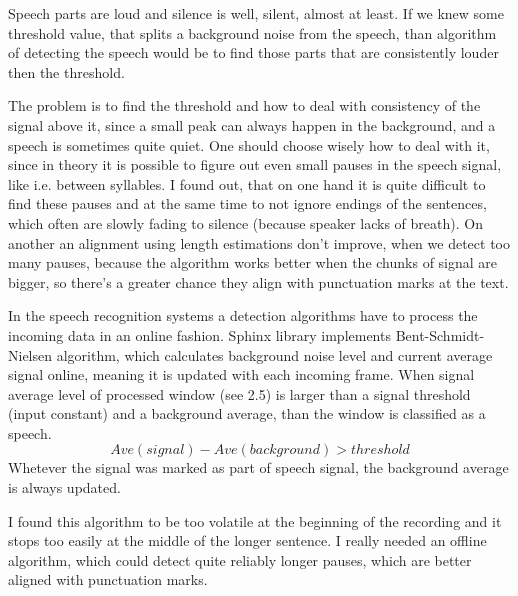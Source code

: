 \documentclass[12pt,a4paper,english]{article}
\begin{document}
\newpage

Speech parts are loud and silence is well, silent, almost at least. If we knew some threshold value, that splits a background noise from the speech, than algorithm of detecting the speech would be to find those parts that are consistently louder then the threshold.  \newline

The problem is to find the threshold and how to deal with consistency of the signal above it, since a small peak can always happen in the background, and a speech is sometimes quite quiet. \newline
One should choose wisely how to deal with it, since in theory it is possible to figure out even small pauses in the speech signal, like i.e. between syllables.
I found out, that on one hand it is quite difficult to find these pauses and at the same time to not ignore endings of the sentences, which often are slowly fading to silence (because speaker lacks of breath). On another an alignment using length estimations don't improve, when we detect too many pauses,
because the algorithm works better when the chunks of signal are bigger, so there's a greater chance they align with punctuation marks at the text. \newline

In the speech recognition systems a detection algorithms have to process the incoming data in an online fashion. Sphinx library implements Bent-Schmidt-Nielsen algorithm, which calculates background noise level and current average signal online, meaning it is updated with each incoming frame. \newline
When signal average level of processed window (see 2.5) is larger than a signal threshold (input constant) and a background average, than the window is classified as a speech. \newline
\begin{equation}
    Ave(signal) - Ave(background) > threshold
\end{equation}
Whetever the signal was marked as part of speech signal, the background average is always updated.\newline


I found this algorithm to be too volatile at the beginning of the recording and it stops too easily at the middle of the longer sentence. I really needed an offline algorithm, which could detect quite reliably longer pauses, which are better aligned with punctuation marks. \newline
\end{document}
